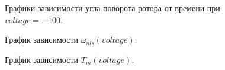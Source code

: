 \documentclass[12pt,titlepage,a4paper]{article}
\begin{document}
\begin{figure}[h]
	\noindent{}
	\caption{Графики зависимости угла поворота ротора от времени при $voltage=-100$.}
\end{figure}
\pagebreak
\begin{figure}[h]
	\noindent{}
	\caption{График зависимости $\omega_{nls}(voltage)$.}
\end{figure}
\begin{figure}[h!]
	\noindent{}
	\caption{График зависимости $T_m(voltage)$.}
\end{figure}
\pagebreak
\end{document}
